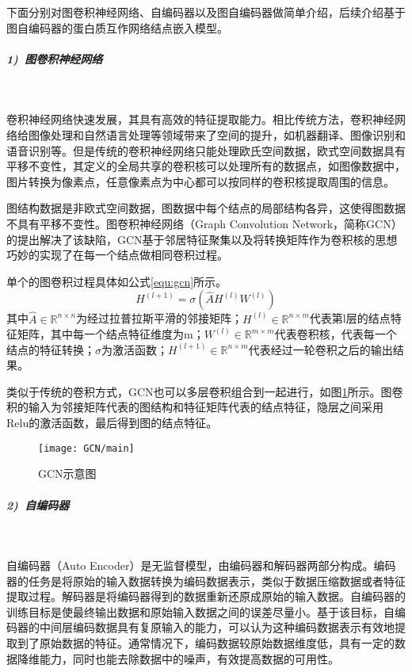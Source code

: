 下面分别对图卷积神经网络、自编码器以及图自编码器做简单介绍，后续介绍基于图自编码器的蛋白质互作网络结点嵌入模型。

\subparagraph{1)~图卷积神经网络} ~

卷积神经网络快速发展，其具有高效的特征提取能力。相比传统方法，卷积神经网络给图像处理和自然语言处理等领域带来了空间的提升，如机器翻译、图像识别和语音识别等。但是传统的卷积神经网络只能处理欧氏空间数据，欧式空间数据具有平移不变性，其定义的全局共享的卷积核可以处理所有的数据点，如图像数据中，图片转换为像素点，任意像素点为中心都可以按同样的卷积核提取周围的信息。

图结构数据是非欧式空间数据，图数据中每个结点的局部结构各异，这使得图数据不具有平移不变性。图卷积神经网络（Graph Convolution Network，简称GCN）的提出解决了该缺陷，GCN基于邻居特征聚集以及将转换矩阵作为卷积核的思想巧妙的实现了在每一个结点做相同卷积过程。

单个的图卷积过程具体如公式\ref{equ:gcn}所示。
\begin{equation}
    \label{equ:gcn}
    H^{(l+1)}=\sigma (\hat{A}H^{(l)}W^{(l)})
\end{equation}
其中$\hat{A}\in \mathbb{R}^{n\times n} $为经过拉普拉斯平滑的邻接矩阵；$H^{(l)}\in \mathbb{R}^{n\times m} $代表第l层的结点特征矩阵，其中每一个结点特征维度为m；$W^{(l)}\in \mathbb{R}^{m\times m} $代表卷积核，代表每一个结点的特征转换；$\sigma $为激活函数；$H^{(l+1)}\in \mathbb{R}^{n\times m} $代表经过一轮卷积之后的输出结果。

类似于传统的卷积方式，GCN也可以多层卷积组合到一起进行，如图\ref{fig:GCN/main}所示。图卷积的输入为邻接矩阵代表的图结构和特征矩阵代表的结点特征，隐层之间采用Relu的激活函数，最后得到图的结点特征。

\begin{figure}[htbp]
    \centering
    \texttt{[image: GCN/main]}
    \caption{GCN示意图}
    \label{fig:GCN/main}
\end{figure}

\subparagraph{2)~自编码器} ~

自编码器（Auto Encoder）是无监督模型，由编码器和解码器两部分构成。编码器的任务是将原始的输入数据转换为编码数据表示，类似于数据压缩数据或者特征提取过程。解码器是将编码器得到的数据重新还原成原始的输入数据。自编码器的训练目标是使最终输出数据和原始输入数据之间的误差尽量小。基于该目标，自编码器的中间层编码数据具有复原输入的能力，可以认为这种编码数据表示有效地提取到了原始数据的特征。通常情况下，编码数据较原始数据维度低，具有一定的数据降维能力，同时也能去除数据中的噪声，有效提高数据的可用性。

